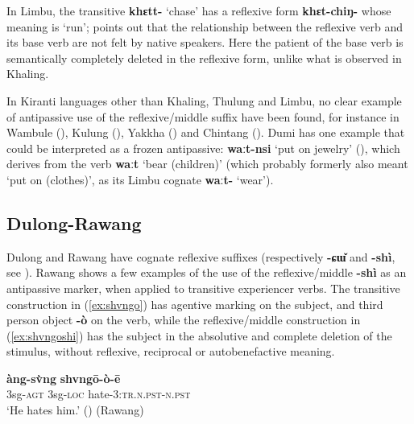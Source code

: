 \documentclass[oneside,a4paper,11pt]{article}
\newcommand{\ipa}[1]{{\phon\textbf{#1}}}
\begin{document}
In Limbu,  the transitive \ipa{khɛtt-} `chase' has a reflexive form \ipa{khɛt-chiŋ-} whose meaning is `run'; \citet[87]{driem87} points out that the relationship between the reflexive verb and its base verb are not felt by native speakers. Here the patient of the base verb is semantically completely deleted in the reflexive form, unlike what is observed in Khaling.

In  Kiranti languages other than Khaling, Thulung and Limbu, no clear example of antipassive use of the reflexive/middle suffix have been found, for instance in Wambule (\citealt[305-6]{opgenort04wambule}), Kulung (\citealt[61-2]{tolsma06kulung}), Yakkha (\citealt[307-9]{schackow15yakkha}) and Chintang (\citealt{schikowski15flexible}). Dumi has one example that could be interpreted as a frozen antipassive:  \ipa{waːt-nsi} `put on jewelry' (\citealt[125-9]{driem93dumi}), which derives from the verb \ipa{waːt} `bear (children)' (which probably formerly also meant `put on (clothes)', as its Limbu cognate \ipa{waːt-} `wear').

\subsection{Dulong-Rawang} \label{sec:rawang}
Dulong and Rawang have cognate reflexive suffixes (respectively \ipa{-ɕɯ̌} and \ipa{-shì}, see \citealt{lapolla04reflexive}). Rawang shows a few examples of the use of the reflexive/middle \ipa{-shì} as an antipassive marker, when applied to transitive experiencer verbs. The transitive construction in (\ref{ex:shvngo}) has agentive marking on the subject, and third person object \ipa{-ò} on the verb, while the reflexive/middle construction in (\ref{ex:shvngoshi}) has the subject in the absolutive and complete deletion of the stimulus, without reflexive, reciprocal or autobenefactive meaning.

\begin{exe}
\ex  \label{ex:shvngo}
\gll \ipa{à:ng-i} \ipa{àng-sv̀ng} \ipa{shvngō-ò-ē} \\
3sg-\textsc{agt} 3sg-\textsc{loc} hate-\textsc{3:tr.n.pst-n.pst} \\
\glt `He hates him.' (\citealt[294]{lapolla01valency}) (Rawang)
\end{exe}
\end{document}
